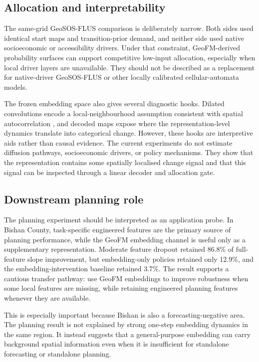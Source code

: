 \documentclass{article}
\begin{document}
\subsection{Allocation and interpretability}

The same-grid GeoSOS-FLUS comparison is deliberately narrow. Both sides used identical start maps and transition-prior demand, and neither side used native socioeconomic or accessibility drivers. Under that constraint, GeoFM-derived probability surfaces can support competitive low-input allocation, especially when local driver layers are unavailable. They should not be described as a replacement for native-driver GeoSOS-FLUS or other locally calibrated cellular-automata models.

The frozen embedding space also gives several diagnostic hooks. Dilated convolutions encode a local-neighbourhood assumption consistent with spatial autocorrelation \citep{tobler1970computer}, and decoded maps expose where the representation-level dynamics translate into categorical change. However, these hooks are interpretive aids rather than causal evidence. The current experiments do not estimate diffusion pathways, socioeconomic drivers, or policy mechanisms. They show that the representation contains some spatially localised change signal and that this signal can be inspected through a linear decoder and allocation gate.

\subsection{Downstream planning role}

The planning experiment should be interpreted as an application probe. In Bishan County, task-specific engineered features are the primary source of planning performance, while the GeoFM embedding channel is useful only as a supplementary representation. Moderate feature dropout retained 86.8\% of full-feature slope improvement, but embedding-only policies retained only 12.9\%, and the embedding-intervention baseline retained 3.7\%. The result supports a cautious transfer pathway: use GeoFM embeddings to improve robustness when some local features are missing, while retaining engineered planning features whenever they are available.

This is especially important because Bishan is also a forecasting-negative area. The planning result is not explained by strong one-step embedding dynamics in the same region. It instead suggests that a general-purpose embedding can carry background spatial information even when it is insufficient for standalone forecasting or standalone planning.
\end{document}
